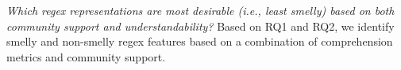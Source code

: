  {\em Which regex representations are most desirable (i.e., least smelly) based on both community support and understandability?}
Based on RQ1 and RQ2, we identify smelly and non-smelly regex features based on a combination of comprehension metrics and community support. \\




%
%
%
%
%
%
%




